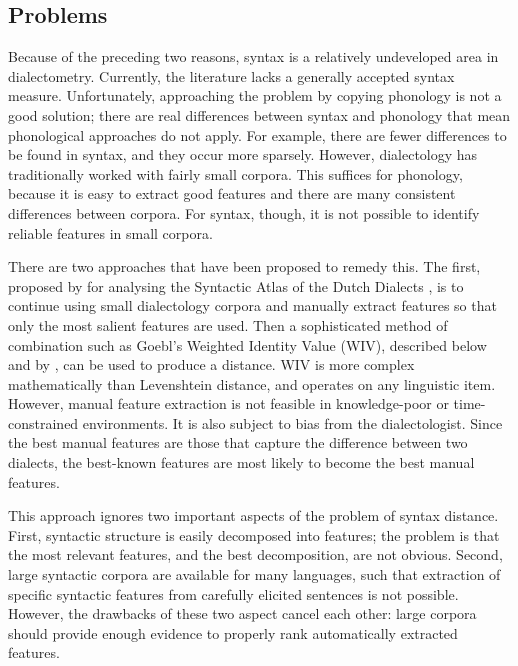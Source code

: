 \documentclass[11pt]{article}
\begin{document}
\subsection{Problems}

Because of the preceding two reasons, syntax is a relatively
undeveloped area in dialectometry. Currently, the literature lacks a
generally accepted syntax measure. Unfortunately, approaching the
problem by copying phonology is not a good solution; there are real
differences between syntax and phonology that mean phonological
approaches do not apply. For example, there are fewer differences to be
found in syntax, and they occur more sparsely.
However, dialectology has traditionally worked with fairly small
corpora. This suffices for phonology, because
it is easy to extract good features and there are many
consistent differences between corpora. For syntax, though, it is not possible
to identify reliable features in small corpora.

There are two approaches that have been proposed to remedy this. The
first, proposed by  for analysing the Syntactic
Atlas of the Dutch Dialects \cite{barbiers05}, is to continue using
small dialectology corpora and manually extract features so that only
the most salient features are used. Then a sophisticated method of
combination such as Goebl's Weighted Identity Value (WIV), described
below and by , can be used to produce a
distance. WIV is more complex mathematically than Levenshtein
distance, and operates on any linguistic item. However, manual feature
extraction is not feasible in knowledge-poor or time-constrained
environments. It is also subject to bias from the
dialectologist. Since the best manual features are those that capture
the difference between two dialects, the best-known features are most
likely to become the best manual features.

This approach ignores two important aspects of the problem of syntax
distance. First, syntactic structure is easily decomposed into
features; the problem is that the most relevant features, and the best
decomposition, are not obvious. Second, large syntactic corpora are
available for many languages, such that extraction of specific
syntactic features from carefully elicited sentences is not
possible. However, the drawbacks of these two aspect cancel each other:
large corpora should provide enough evidence to properly rank
automatically extracted features.
\end{document}
